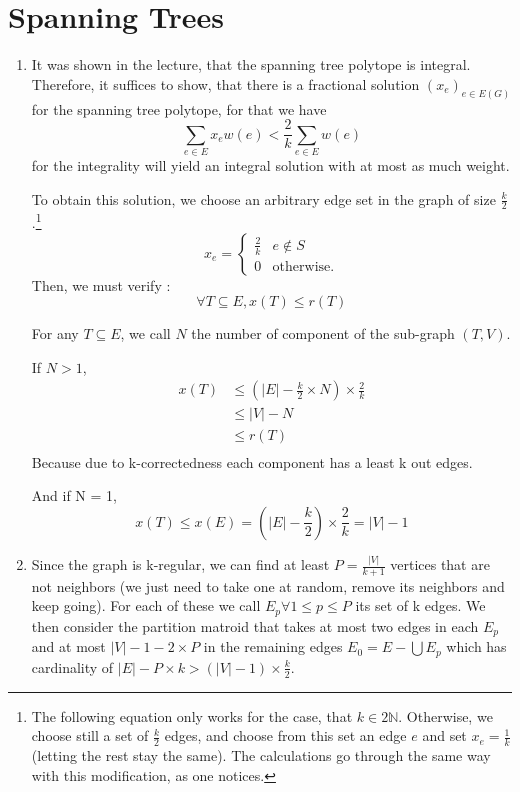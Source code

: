 \documentclass{scrartcl}
\newcommand\1{\mathbf{1}}
\begin{document}
\section{Spanning Trees}
\begin{enumerate}
\item
It was shown in the lecture, that the spanning tree polytope is integral. Therefore, it suffices to show, that there is a fractional solution $(x_e)_{e \in E(G)}$ for the spanning tree polytope, for that we have
\[
\sum_{e \in E} x_e w(e) < \frac{2}{k} \sum_{e \in E} w(e)
\]
for the integrality will yield an integral solution with at most as much weight. 

To obtain this solution, we choose an arbitrary edge set in the graph of size $\frac{k}{2}$.\footnote{The following equation only works for the case, that $k\in 2\mathbb{N}$. Otherwise, we choose still a set of $\frac{k}{2}$ edges, and choose from this set an edge $e$ and set $x_e = \frac{1}{k}$ (letting the rest stay the same). The calculations go through the same way with this modification, as one notices.}
\[
x_e = \begin{cases} \frac{2}{k} & e \notin S \\ 0 &\text{otherwise.}\end{cases}
\]
Then, we must verify :
\[
\forall T \subseteq E, x(T) \leq r(T)
\]

For any $T\subseteq E$, we call $N$ the number of component of the sub-graph $(T,V)$.

If $N > 1$,
\begin{align*}
x(T) &\leq (|E| - \frac{k}{2} \times N ) \times\frac{2}{k} \\
&\leq |V| - N \\
&\leq r(T) \\
\end{align*}
Because due to k-correctedness each component has a least k out edges.

And if N = 1,
\[
x(T) \leq x(E) = (|E| - \frac{k}{2}) \times \frac{2}{k} = |V| - 1
\]
\item
Since the graph is k-regular, we can find at least $P = \frac{|V|}{k+1}$ vertices that are not neighbors (we just need to take one at random, remove its neighbors and keep going). For each of these we call $E_p \forall 1 \leq p \leq P$ its set of k edges. We then consider the partition matroid that takes at most two edges in each $E_p$ and at most $|V| - 1 - 2 \times P$ in the remaining edges $E_0 = E-\bigcup E_p$ which has cardinality of $|E| - P \times k > (|V| - 1) \times \frac{k}{2}$.


\end{enumerate}
\end{document}
